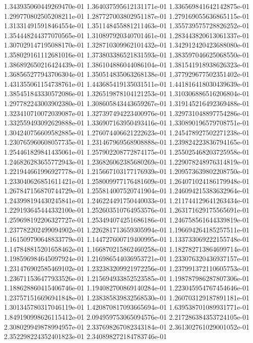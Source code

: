 1.343935060449269470e-01
1.364037595612131171e-01
1.336569841642142875e-01
1.299770802505208211e-01
1.287727003802951187e-01
1.279169055636865115e-01
1.313314915918464554e-01
1.351148455881211463e-01
1.355739575728826252e-01
1.354448244377070565e-01
1.310897920340701461e-01
1.283443820613061337e-01
1.307029147195088170e-01
1.328710309962101432e-01
1.342912420423688080e-01
1.358029161112681016e-01
1.373803386521831593e-01
1.383597046625068550e-01
1.386892650216424439e-01
1.386104886044086104e-01
1.381541918938626323e-01
1.368565277943706304e-01
1.350514835063268138e-01
1.377929677502351402e-01
1.431355061154738761e-01
1.443685419135031511e-01
1.441816418030439639e-01
1.385451843330572086e-01
1.326519878104121253e-01
1.310306886516206804e-01
1.297782243003902380e-01
1.308605843443659267e-01
1.319145216492369488e-01
1.323410710072039087e-01
1.327397494223400976e-01
1.329731048897754286e-01
1.332559493092629888e-01
1.336907163950493416e-01
1.330890196579708751e-01
1.304240756609582885e-01
1.276074406621222623e-01
1.245478927502271238e-01
1.230765960608057735e-01
1.231467969568908888e-01
1.239824223836794165e-01
1.254461829841435061e-01
1.257902208772874175e-01
1.255025468203725958e-01
1.246826283655772943e-01
1.236826062385680269e-01
1.229078248976314819e-01
1.221944661996927778e-01
1.215667103177176939e-01
1.209573639802208750e-01
1.233040626851611421e-01
1.258009977176481609e-01
1.264071024186179948e-01
1.267847156870744729e-01
1.255814007520741904e-01
1.246094215383632964e-01
1.243998194430245841e-01
1.246224491750440033e-01
1.211744129641263434e-01
1.229193645444332100e-01
1.252603510764953576e-01
1.263171629175565691e-01
1.259698192206327727e-01
1.253494074251686186e-01
1.246758561644339819e-01
1.237782202499094902e-01
1.226281713659305994e-01
1.196694264185257511e-01
1.161509790648833779e-01
1.144727600719400995e-01
1.133733069222155748e-01
1.147848815201658462e-01
1.166870215862460258e-01
1.182782713864699714e-01
1.198596984645097924e-01
1.216986544036953721e-01
1.233076320436937157e-01
1.231476902585469102e-01
1.232383209921972256e-01
1.237991372110605753e-01
1.236711536477933526e-01
1.215694933852523585e-01
1.198787986287807306e-01
1.188628860415406746e-01
1.194082700869140284e-01
1.223045954767454646e-01
1.237571516696941848e-01
1.238385839832568530e-01
1.260703129187891181e-01
1.301345780317046119e-01
1.420870817093665694e-01
1.639538701089931771e-01
1.849190998626115412e-01
2.094959753065094576e-01
2.217286384353724105e-01
2.308029949878994957e-01
2.337698267082343184e-01
2.361302761029001052e-01
2.352298224352401823e-01
2.340898272184783746e-01
